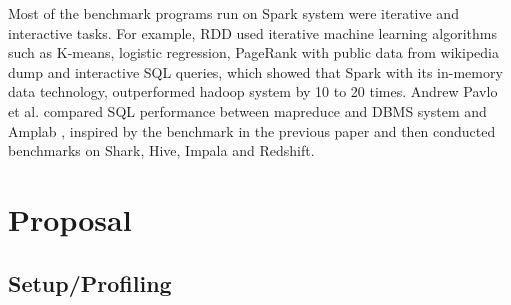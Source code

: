 \documentclass{article}
\begin{document}
Most of the benchmark programs run on Spark system were iterative and interactive tasks. For example, RDD\citep{zaharia_rdd} used iterative machine learning algorithms such as K-means, logistic regression, PageRank with public data from wikipedia dump and interactive SQL queries, which showed that Spark with its in-memory data technology, outperformed hadoop system by 10 to 20 times. Andrew Pavlo et al. \cite{andrew} compared SQL performance between mapreduce and DBMS system and Amplab \citep{amplab_bench}, inspired by the benchmark in the previous paper and then conducted benchmarks on Shark, Hive\citep{ashish}, Impala and Redshift.



\section*{Proposal}

\subsection*{Setup/Profiling}

\end{document}
